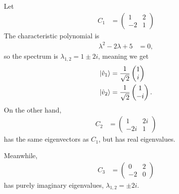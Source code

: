 \documentclass[10pt]{mypackage}
\begin{document}
\begin{example}
Let
\begin{align*}
  C_1 &= \begin{pmatrix}1 & 2 \\ -2 & 1\end{pmatrix}
\end{align*}
The characteristic polynomial is
\begin{align*}
  \lambda^2 -2\lambda + 5 &= 0,
\end{align*}
so the spectrum is $\lambda_{1,2} = 1 \pm 2i$, meaning we get
\begin{align*}
  \ket{\hat{v}_1} &= \frac{1}{\sqrt{2}} \begin{pmatrix}1\\i\end{pmatrix}\\
  \ket{\hat{v}_2} &= \frac{1}{\sqrt{2}} \begin{pmatrix}1\\-i\end{pmatrix}.
\end{align*}
On the other hand,
\begin{align*}
  C_2 &= \begin{pmatrix}1 & 2i \\ -2i & 1\end{pmatrix}
\end{align*}
has the same eigenvectors as $C_1$, but has real eigenvalues.\newline

Meanwhile,
\begin{align*}
  C_3 &= \begin{pmatrix}0 & 2 \\ -2 & 0\end{pmatrix}
\end{align*}
has purely imaginary eigenvalues, $\lambda_{1,2} = \pm 2i$.
\end{example}
\end{document}
